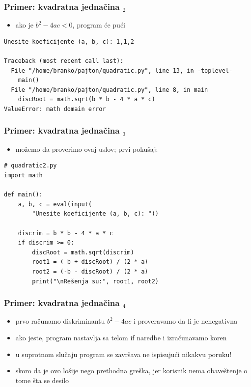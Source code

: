 \documentclass[utf8,compress,aspectratio=169]{beamer}
\begin{document}
\begin{frame}[fragile]
  \frametitle{Primer: kvadratna jednačina $_2$}
  \begin{itemize}
    \item ako je $b^2 - 4ac < 0$, program će pući
  \end{itemize}
\begin{verbatim}
Unesite koeficijente (a, b, c): 1,1,2

Traceback (most recent call last):
  File "/home/branko/pajton/quadratic.py", line 13, in -toplevel-
    main()
  File "/home/branko/pajton/quadratic.py", line 8, in main
    discRoot = math.sqrt(b * b - 4 * a * c)
ValueError: math domain error
\end{verbatim}
\end{frame}

\begin{frame}[fragile]
  \frametitle{Primer: kvadratna jednačina $_3$}
  \begin{itemize}
    \item možemo da proverimo ovaj uslov; prvi pokušaj:
  \end{itemize}
\begin{verbatim}
# quadratic2.py
import math

def main():
    a, b, c = eval(input(
        "Unesite koeficijente (a, b, c): "))

    discrim = b * b - 4 * a * c
    if discrim >= 0:
        discRoot = math.sqrt(discrim)
        root1 = (-b + discRoot) / (2 * a)
        root2 = (-b - discRoot) / (2 * a)
        print("\nRešenja su:", root1, root2)
\end{verbatim}
\end{frame}

\begin{frame}[fragile]
  \frametitle{Primer: kvadratna jednačina $_4$}
  \begin{itemize}
    \item prvo računamo diskriminantu $b^2-4ac$ i proveravamo da li je nenegativna
    \item ako jeste, program nastavlja sa telom if naredbe i izračunavamo koren
    \item u suprotnom slučaju program se završava ne ispisujući nikakvu poruku!
    \item skoro da je ovo lošije nego prethodna greška, jer korisnik nema obaveštenje o tome šta se desilo
  \end{itemize}
\end{frame}
\end{document}
